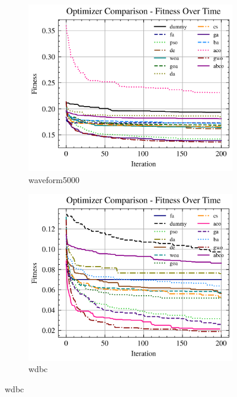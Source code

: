 \begin{figure}[htp]
    \begin{subfigure}[htp]{0.45\textwidth}
        \includegraphics[width=\textwidth]{imagenes/fitness_charts/img/binary/waveform5000/optimizers_fitness_svc.png}
        \caption{waveform5000}
        \label{fig:convergencia_waveform5000_svc}
    \end{subfigure}
    \begin{subfigure}[htp]{0.45\textwidth}
        \includegraphics[width=\textwidth]{imagenes/fitness_charts/img/binary/wdbc/optimizers_fitness_svc.png}
        \caption{wdbc}
        \label{fig:convergencia_wdbc_svc}
    \end{subfigure}


\end{figure}
